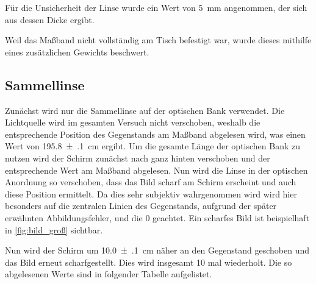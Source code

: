 \documentclass[11pt,ngerman]{scrartcl}
\begin{document}
Für die Unsicherheit der Linse wurde ein Wert von \SI{5}{mm} angenommen, der sich aus dessen Dicke ergibt.

Weil das Maßband nicht vollständig am Tisch befestigt war, wurde dieses mithilfe eines zusätzlichen Gewichts beschwert.

\subsection{Sammellinse}

Zunächst wird nur die Sammellinse auf der optischen Bank verwendet. Die Lichtquelle wird im gesamten Versuch nicht verschoben, weshalb die entsprechende Position des Gegenstands am Maßband abgelesen wird, was einen Wert von \SI{195.8(1)}{cm} ergibt. Um die gesamte Länge der optischen Bank zu nutzen wird der Schirm zunächst nach ganz hinten verschoben und der entsprechende Wert am Maßband abgelesen. Nun wird die Linse in der optischen Anordnung so verschoben, dass das Bild scharf am Schirm erscheint und auch diese Position ermittelt. Da dies sehr subjektiv wahrgenommen wird  wird hier besonders auf die zentralen Linien des Gegenstands, aufgrund der später erwähnten Abbildungsfehler, und die 0 geachtet. Ein scharfes Bild ist beispielhaft in \autoref{fig:bild_groß} sichtbar.

Nun wird der Schirm um \SI{10.0(1)}{cm} näher an den Gegenstand geschoben und das Bild erneut scharfgestellt. Dies wird insgesamt 10 mal wiederholt. Die so abgelesenen Werte sind in folgender Tabelle aufgelistet.
\end{document}

